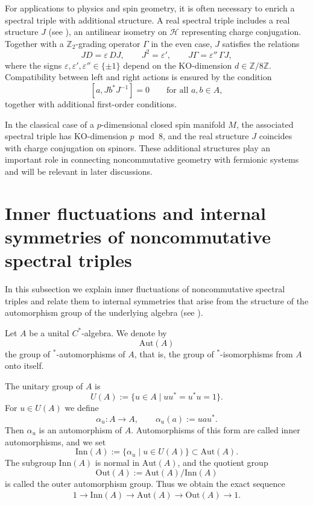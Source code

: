 \documentclass[12pt]{article}
\theoremstyle{definition} %
\theoremstyle{plain} %
\theoremstyle{remark} %
\theoremstyle{underline}
\begin{document}
For applications to physics and spin geometry, it is often necessary to enrich a spectral triple with additional structure. A real spectral triple includes a real structure $J$ (see \cite{Landi:1997sh}), an antilinear isometry on $\mathcal{H}$ representing charge conjugation. Together with a $\mathbb{Z}_2$-grading operator $\Gamma$ in the even case, $J$ satisfies the relations
\[
JD = \varepsilon\, DJ, \qquad
J^2 = \varepsilon', \qquad
J\Gamma = \varepsilon''\, \Gamma J,
\]
where the signs $\varepsilon,\varepsilon',\varepsilon''\in\{\pm1\}$ depend on the KO-dimension $d\in\mathbb{Z}/8\mathbb{Z}$. Compatibility between left and right actions is ensured by the condition
\[
[a, J b^* J^{-1}] = 0 \qquad \text{for all } a,b\in A,
\]
together with additional first-order conditions.

In the classical case of a $p$-dimensional closed spin manifold $M$, the associated spectral triple has KO-dimension $p \bmod 8$, and the real structure $J$ coincides with charge conjugation on spinors. These additional structures play an important role in connecting noncommutative geometry with fermionic systems and will be relevant in later discussions.



\section{Inner fluctuations and internal symmetries of noncommutative spectral triples}\label{app:inner}

In this subsection we explain inner fluctuations of noncommutative spectral triples
and relate them to internal symmetries that arise from the structure of the
automorphism group of the underlying algebra (see \cite{chamseddine1997spectral,connes2006inner}).

Let $A$ be a unital $C^\ast$-algebra.
We denote by
\[
  \mathrm{Aut}(A)
\]
the group of $^\ast$-automorphisms of $A$, that is, the group of $^\ast$-isomorphisms
from $A$ onto itself.

The unitary group of $A$ is
\[
  U(A) := \{ u \in A \mid uu^\ast = u^\ast u = 1 \}.
\]
For $u \in U(A)$ we define
\[
  \alpha_u : A \to A,\qquad
  \alpha_u(a) := u a u^\ast .
\]
Then $\alpha_u$ is an automorphism of $A$.
Automorphisms of this form are called inner automorphisms, and we set
\[
  \mathrm{Inn}(A)
  := \{ \alpha_u \mid u\in U(A) \}
  \subset \mathrm{Aut}(A).
\]
The subgroup $\mathrm{Inn}(A)$ is normal in $\mathrm{Aut}(A)$, and the quotient
group
\[
  \mathrm{Out}(A) := \mathrm{Aut}(A) / \mathrm{Inn}(A)
\]
is called the outer automorphism group.
Thus we obtain the exact sequence
\begin{align}
  \label{eq:exact-sequence-aut}
  1 \longrightarrow \mathrm{Inn}(A)
    \longrightarrow \mathrm{Aut}(A)
    \longrightarrow \mathrm{Out}(A)
    \longrightarrow 1 .
\end{align}
\end{document}
